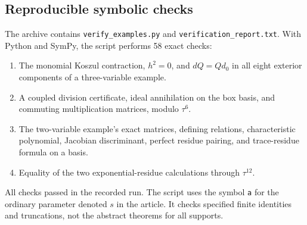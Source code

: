 \documentclass[11pt,letterpaper]{article}
\theoremstyle{definition}
\theoremstyle{remark}
\numberwithin{equation}{section}
\begin{document}
\subsection{Reproducible symbolic checks}
The archive contains \texttt{verify\_examples.py} and \texttt{verification\_report.txt}. With Python and SymPy, the script performs 58 exact checks:
\begin{enumerate}
\item The monomial Koszul contraction, $h^2=0$, and $dQ=Qd_0$ in all eight exterior components of a three-variable example.
\item A coupled division certificate, ideal annihilation on the box basis, and commuting multiplication matrices, modulo $\tau^6$.
\item The two-variable example's exact matrices, defining relations, characteristic polynomial, Jacobian discriminant, perfect residue pairing, and trace-residue formula on a basis.
\item Equality of the two exponential-residue calculations through $\tau^{12}$.
\end{enumerate}
All checks passed in the recorded run. The script uses the symbol \texttt{a} for the ordinary parameter denoted $s$ in the article. It checks specified finite identities and truncations, not the abstract theorems for all supports.
\end{document}
